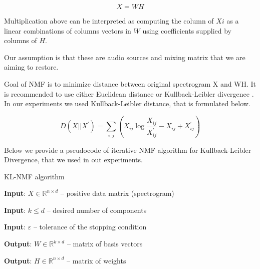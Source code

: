 \documentclass[../main.tex]{subfiles} %
\begin{document}
$$X = W H$$

Multiplication above can be interpreted as computing the column of $Xi$ as a linear combinations of columns vectors in $W$ using coefficients supplied by columns of $H$.

Our assumption is that these are audio sources and mixing matrix that we are aiming to restore.

Goal of NMF is to minimize distance between original spectrogram X and WH. It is recommended to use either Euclidean distance or Kullback-Leibler divergence \cite{nmf_tutorial}. In our experiments we used Kullback-Leibler distance, that is formulated below.

$$D(X || X^{'}) = \sum_{i,j} (X_{ij} \log{\frac{X_{ij}}{X_{ij}^{'}} - X_{ij} + X_{ij}^{'}})$$

Below we provide a pseudocode of iterative NMF algorithm for Kullback-Leibler Divergence, that we used in out experiments.

\begin{algorithm} 
	\begin{algorithmic}
		\caption{KL-NMF algorithm}\label{nmf}
		\item \textbf{Input}: $X  \in \mathbb{R}^{n \times d}$ -- positive data matrix (spectrogram)
		\item \textbf{Input}: $k \le d$ -- desired number of components
		\item \textbf{Input}: $\varepsilon$ -- tolerance of the stopping condition
		\item \textbf{Output}: $W \in \mathbb{R}^{k \times d}$ -- matrix of basis vectors
		\item \textbf{Output}: $H \in \mathbb{R}^{n \times d}$ -- matrix of weights
		
		\EndWhile

		\EndFunction
	\end{algorithmic}
\end{algorithm}
\end{document}
